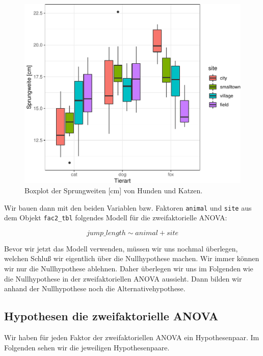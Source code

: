 \documentclass[
  letterpaper,
  DIV=11,
  oneside]{scrreport}
\begin{document}
\begin{figure}

{\centering \includegraphics{./stat-tests-anova_files/figure-pdf/fig-boxplot-anova-2-1.pdf}

}

\caption{\label{fig-boxplot-anova-2}Boxplot der Sprungweiten {[}cm{]}
von Hunden und Katzen.}

\end{figure}

Wir bauen dann mit den beiden Variablen bzw. Faktoren \texttt{animal}
und \texttt{site} aus dem Objekt \texttt{fac2\_tbl} folgendes Modell für
die zweifaktorielle ANOVA:

\[
jump\_length \sim animal + site
\]

Bevor wir jetzt das Modell verwenden, müssen wir uns nochmal überlegen,
welchen Schluß wir eigentlich über die Nullhypothese machen. Wir immer
können wir nur die Nullhypothese ablehnen. Daher überlegen wir uns im
Folgenden wie die Nullhypothese in der zweifaktoriellen ANOVA aussieht.
Dann bilden wir anhand der Nullhypothese noch die Alternativehypothese.

\hypertarget{hypothesen-die-zweifaktorielle-anova}{%
\subsection{Hypothesen die zweifaktorielle
ANOVA}\label{hypothesen-die-zweifaktorielle-anova}}

Wir haben für jeden Faktor der zweifaktoriellen ANOVA ein
Hypothesenpaar. Im Folgenden sehen wir die jeweiligen Hypothesenpaare.
\end{document}
